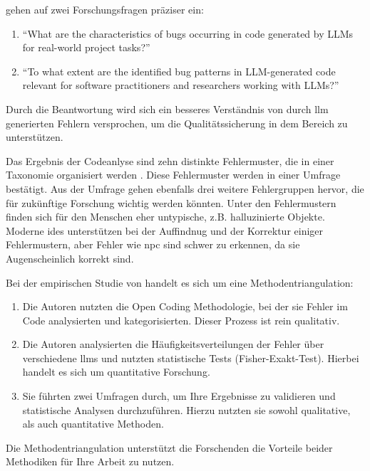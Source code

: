 \textcite[3]{tambon2025} gehen auf zwei Forschungsfragen präziser ein:
\begin{enumerate}
	\item \enquote{What are the characteristics of bugs occurring in code generated by LLMs for real-world project tasks?}
	\item \enquote{To what extent are the identified bug patterns in LLM-generated code relevant for software practitioners and researchers working with LLMs?}
\end{enumerate}
Durch die Beantwortung wird sich ein besseres Verständnis von durch \gls{llm} generierten Fehlern versprochen, um die Qualitätssicherung in dem Bereich zu unterstützen.

Das Ergebnis der Codeanlyse sind zehn distinkte Fehlermuster, die in einer Taxonomie organisiert werden \parencite[12]{tambon2025}. Diese Fehlermuster werden in einer Umfrage bestätigt. Aus der Umfrage gehen ebenfalls drei weitere Fehlergruppen hervor, die für zukünftige Forschung wichtig werden könnten. Unter den Fehlermustern finden sich für den Menschen eher untypische, z.B. halluzinierte Objekte. Moderne \glspl{ide} unterstützen bei der Auffindnug und der Korrektur einiger Fehlermustern, aber Fehler wie \gls{npc} sind schwer zu erkennen, da sie Augenscheinlich korrekt sind.

Bei der empirischen Studie von \textcite{tambon2025} handelt es sich um eine Methodentriangulation:
\begin{enumerate}
	\item Die Autoren nutzten die Open Coding Methodologie, bei der sie Fehler im Code analysierten und kategorisierten. Dieser Prozess ist rein qualitativ.
	\item Die Autoren analysierten die Häufigkeitsverteilungen der Fehler über verschiedene \glspl{llm} und nutzten statistische Tests (Fisher-Exakt-Test). Hierbei handelt es sich um quantitative Forschung.
	\item Sie führten zwei Umfragen durch, um Ihre Ergebnisse zu validieren und statistische Analysen durchzuführen. Hierzu nutzten sie sowohl qualitative, als auch quantitative Methoden.
\end{enumerate}
Die Methodentriangulation unterstützt die Forschenden die Vorteile beider Methodiken für Ihre Arbeit zu nutzen.

